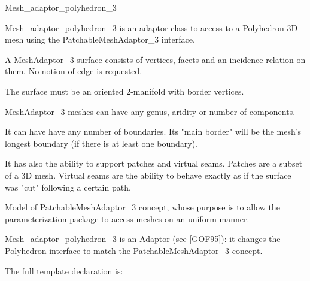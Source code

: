 

\begin{ccRefClass}{Mesh_adaptor_polyhedron_3}  %



\ccDefinition


Mesh\_adaptor\_polyhedron\_3 is an adaptor class to access to a Polyhedron 3D mesh using the PatchableMeshAdaptor\_3 interface.

A MeshAdaptor\_3 surface consists of vertices, facets and an incidence relation on them. No notion of edge is requested.

The surface must be an oriented 2-manifold with border vertices.

MeshAdaptor\_3 meshes can have any genus, aridity or number of components.

It can have have any number of boundaries. Its "main border" will be the mesh's longest boundary (if there is at least one boundary).

It has also the ability to support patches and virtual seams. Patches are a subset of a 3D mesh. Virtual seams are the ability to behave exactly as if the surface was "cut" following a certain path.



\ccIsModel

Model of PatchableMeshAdaptor\_3 concept, whose purpose is to allow the parameterization package to access meshes on an uniform manner.



Mesh\_adaptor\_polyhedron\_3 is an Adaptor (see [GOF95]): it changes the Polyhedron interface to match the PatchableMeshAdaptor\_3 concept.



\ccParameters

The full template declaration is:


\end{ccRefClass}

